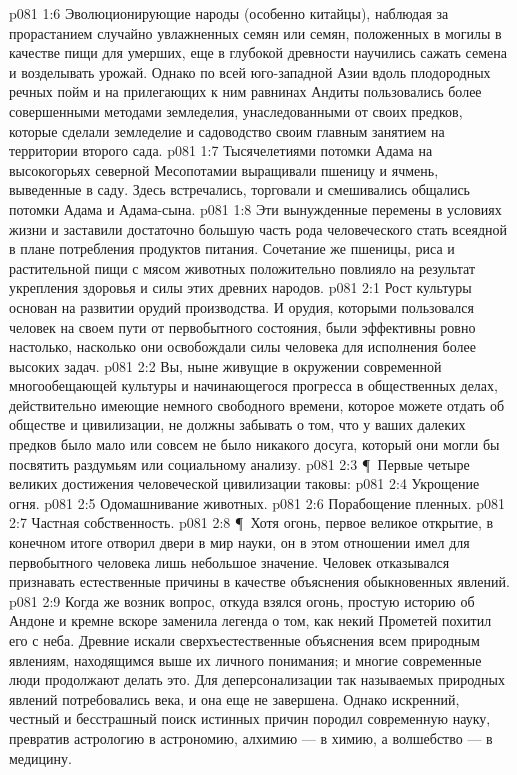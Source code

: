 \vs p081 1:6 Эволюционирующие народы (особенно китайцы), наблюдая за прорастанием случайно увлажненных семян или семян, положенных в могилы в качестве пищи для умерших, еще в глубокой древности научились сажать семена и возделывать урожай. Однако по всей юго\hyp{}западной Азии вдоль плодородных речных пойм и на прилегающих к ним равнинах Андиты пользовались более совершенными методами земледелия, унаследованными от своих предков, которые сделали земледелие и садоводство своим главным занятием на территории второго сада.
\vs p081 1:7 Тысячелетиями потомки Адама на высокогорьях северной Месопотамии выращивали пшеницу и ячмень, выведенные в саду. Здесь встречались, торговали и смешивались общались потомки Адама и Адама\hyp{}сына.
\vs p081 1:8 Эти вынужденные перемены в условиях жизни и заставили достаточно большую часть рода человеческого стать всеядной в плане потребления продуктов питания. Сочетание же пшеницы, риса и растительной пищи с мясом животных положительно повлияло на результат укрепления здоровья и силы этих древних народов.
\vs p081 2:1 Рост культуры основан на развитии орудий производства. И орудия, которыми пользовался человек на своем пути от первобытного состояния, были эффективны ровно настолько, насколько они освобождали силы человека для исполнения более высоких задач.
\vs p081 2:2 Вы, ныне живущие в окружении современной многообещающей культуры и начинающегося прогресса в общественных делах, действительно имеющие немного свободного времени, которое можете отдать  об обществе и цивилизации, не должны забывать о том, что у ваших далеких предков было мало или совсем не было никакого досуга, который они могли бы посвятить раздумьям или социальному анализу.
\vs p081 2:3 \P\ Первые четыре великих достижения человеческой цивилизации таковы:
\vs p081 2:4 \bibnobreakspace Укрощение огня.
\vs p081 2:5 \bibnobreakspace Одомашнивание животных.
\vs p081 2:6 \bibnobreakspace Порабощение пленных.
\vs p081 2:7 \bibnobreakspace Частная собственность.
\vs p081 2:8 \P\ Хотя огонь, первое великое открытие, в конечном итоге отворил двери в мир науки, он в этом отношении имел для первобытного человека лишь небольшое значение. Человек отказывался признавать естественные причины в качестве объяснения обыкновенных явлений.
\vs p081 2:9 Когда же возник вопрос, откуда взялся огонь, простую историю об Андоне и кремне вскоре заменила легенда о том, как некий Прометей похитил его с неба. Древние искали сверхъестественные объяснения всем природным явлениям, находящимся выше их личного понимания; и многие современные люди продолжают делать это. Для деперсонализации так называемых природных явлений потребовались века, и она еще не завершена. Однако искренний, честный и бесстрашный поиск истинных причин породил современную науку, превратив астрологию в астрономию, алхимию --- в химию, а волшебство --- в медицину.
